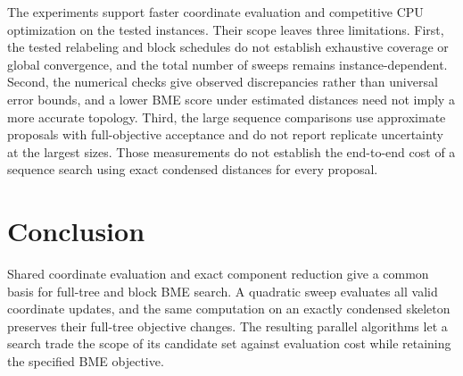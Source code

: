 \documentclass[11pt,a4paper]{article}
\makeatletter
\DeclareRobustCommand{\_}{\ifmmode\nfss@text{\textunderscore}\else\textunderscore\allowbreak\fi}
\theoremstyle{definition}
\makeatother
\begin{document}
The experiments support faster coordinate evaluation and competitive CPU optimization on the tested instances.
Their scope leaves three limitations.
First, the tested relabeling and block schedules do not establish exhaustive coverage or global convergence, and the total number of sweeps remains instance-dependent.
Second, the numerical checks give observed discrepancies rather than universal error bounds, and a lower BME score under estimated distances need not imply a more accurate topology.
Third, the large sequence comparisons use approximate proposals with full-objective acceptance and do not report replicate uncertainty at the largest sizes.
Those measurements do not establish the end-to-end cost of a sequence search using exact condensed distances for every proposal.

\section{Conclusion}

Shared coordinate evaluation and exact component reduction give a common basis for full-tree and block BME search.
A quadratic sweep evaluates all valid coordinate updates, and the same computation on an exactly condensed skeleton preserves their full-tree objective changes.
The resulting parallel algorithms let a search trade the scope of its candidate set against evaluation cost while retaining the specified BME objective.



\clearpage
\appendix

\end{document}
